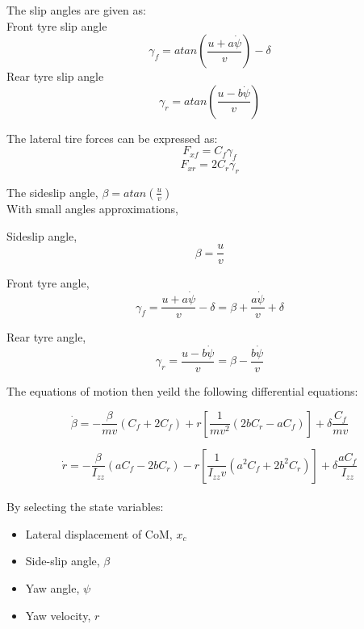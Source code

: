 \documentclass[a4paper, twocolumn]{article}
\begin{document}
\noindent
The slip angles are given as:
\\
Front tyre slip angle
$$
\gamma_{f}= atan\left(\frac{u+a\dot{\psi}}{v}\right)- \delta
$$
Rear tyre slip angle
$$
\gamma_{r}= atan\left(\frac{u-b\dot{\psi}}{v}\right)
$$

\noindent
The lateral tire forces can be expressed as:
$$
F_{xf}= C_{f}\gamma_{f}
$$
$$
F_{xr}= 2C_{r}\gamma_{r}
$$

\noindent
The sideslip angle, $\beta= atan\left(\frac{u}{v}\right)$
\\

\noindent
With small angles approximations,

Sideslip angle, 
$$\beta= \frac{u}{v}$$

Front tyre angle, 
$$\gamma_{f}= \frac{u+a\dot{\psi}}{v}- \delta= \beta + \frac{a\dot{\psi}}{v}+ \delta$$

Rear tyre angle, 
$$\gamma_{r}= \frac{u-b\dot{\psi}}{v}= \beta- \frac{b\dot{\psi}}{v}$$


\noindent
The equations of motion then yeild the following differential equations:

\footnotesize 
$$
\dot{\beta}= -\frac{\beta}{mv}\left( C_{f} + 2C_{f} \right) + r \left[\frac{1}{mv^{2}} \left(2bC_{r} 
    - aC_{f}\right)\right] + \delta \frac{C_{f}}{mv}  
$$

$$
\dot{r}= -\frac{\beta}{I_{zz}}\left(aC_{f} - 2bC_{r}\right) - r \left[\frac{1}{I_{zz}v} 
    \left(a^{2}C_{f} + 2b^{2}C_{r}\right) \right] + \delta \frac{aC_{f}}{I_{zz}} 
$$
\\

\normalsize
\noindent
By selecting the state variables:
\begin{itemize}
    \item Lateral displacement of CoM, $x_{c}$
    \item Side-slip angle, $\beta$
    \item Yaw angle, $\psi$
    \item Yaw velocity, $r$
\end{itemize}
\end{document}
